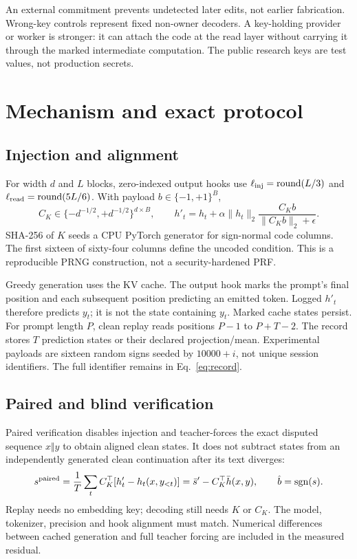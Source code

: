 \documentclass[11pt]{article}
\newcommand{\sgn}{\operatorname{sgn}}
\begin{document}
An external commitment prevents undetected later edits, not earlier fabrication.
Wrong-key controls represent fixed non-owner decoders. A key-holding provider or
worker is stronger: it can attach the code at the read layer without carrying it
through the marked intermediate computation. The public research keys are test
values, not production secrets.

\section{Mechanism and exact protocol}
\subsection{Injection and alignment}
For width $d$ and $L$ blocks, zero-indexed output hooks use
$\ell_{\rm inj}=\operatorname{round}(L/3)$ and
$\ell_{\rm read}=\operatorname{round}(5L/6)$. With payload $b\in\{-1,+1\}^B$,
\begin{equation}
 C_K\in\{-d^{-1/2},+d^{-1/2}\}^{d\times B},\qquad
 h'_t=h_t+\alpha\|h_t\|_2\frac{C_Kb}{\|C_Kb\|_2+\epsilon}.\label{eq:inject}
\end{equation}
SHA-256 of $K$ seeds a CPU PyTorch generator for sign-normal code columns. The
first sixteen of sixty-four columns define the uncoded condition. This is a
reproducible PRNG construction, not a security-hardened PRF.

Greedy generation uses the KV cache. The output hook marks the prompt's final
position and each subsequent position predicting an emitted token. Logged $h'_t$
therefore predicts $y_t$; it is not the state containing $y_t$. Marked cache states
persist. For prompt length $P$, clean replay reads positions $P-1$ to $P+T-2$.
The record stores $T$ prediction states or their declared projection/mean.
Experimental payloads are sixteen random signs seeded by $10000+i$, not unique
session identifiers. The full identifier remains in Eq.~\eqref{eq:record}.

\subsection{Paired and blind verification}
Paired verification disables injection and teacher-forces the exact disputed
sequence $x\Vert y$ to obtain aligned clean states. It does not subtract states
from an independently generated clean continuation after its text diverges:
\begin{equation}
 s^{\rm paired}=\frac1T\sum_t C_K^\top[h'_t-h_t(x,y_{<t})]
             =\bar s'-C_K^\top\bar h(x,y),\qquad \hat b=\sgn(s).
\end{equation}
Replay needs no embedding key; decoding still needs $K$ or $C_K$. The model,
tokenizer, precision and hook alignment must match. Numerical differences between
cached generation and full teacher forcing are included in the measured residual.
\end{document}
